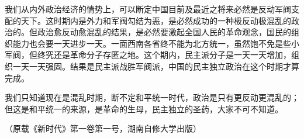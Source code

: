我们从内外政治经济的情势上，可以断定中国目前及最近之将来必然是反动军阀支配的天下。这时期内是外力和军阀勾结为恶，是必然成功的一种极反动极混乱的政治的。但政治愈反动愈混乱的结果，是必然要激起全国人民的革命观念，国民的组织能力也会要一天进步一天。一面西南各省终不能为北方统一，虽然饱不免是些小军阀，但终究还是革命分子存匿之地。这个期内，民主派分子是一天一天增加，组织一天一天强固。结果是民主派战胜军阀派，中国的民主独立政治在这个时期才算完成。

我们只知道现在是混乱时期，断不定和平统一时代，政治是只有更反动更混乱的；但这是和平统一的来源，是革命的生母，民主独立的圣药，大家不可不知道。

\begin{flushright}（原载《新时代》第一卷第一号，湖南自修大学出版）\end{flushright}

